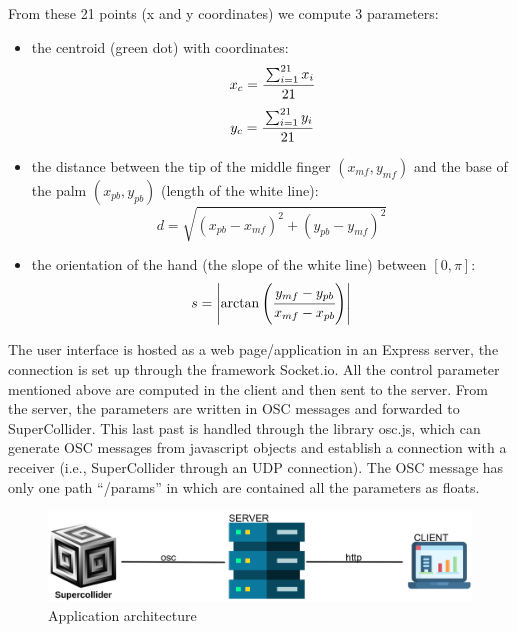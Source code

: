 \documentclass[a4paper,12pt]{report}
\begin{document}
From these 21 points (x and y coordinates) we compute 3 parameters:
\begin{itemize}
	\item the centroid (green dot) with coordinates:
	\[x_c = \cfrac{\sum_{i = 1}^{21}x_i}{21}\]
	\[y_c = \cfrac{\sum_{i = 1}^{21}y_i}{21}\]
	\item the distance between the tip of the middle finger $(x_{mf}, y_{mf})$ and the base of the palm $(x_{pb}, y_{pb})$ (length of the white line): 
	\[d = \sqrt{(x_{pb} - x_{mf})^2 + (y_{pb} - y_{mf})^2}\]
	\item the orientation of the hand (the slope of the white line) between $[0, \pi]$:
	\[s = \left\lvert\arctan{\left(\cfrac {y_{mf} - y_{pb}}{x_{mf} - x_{pb}}\right)}\right\rvert \]
\end{itemize}  

 
The user interface is hosted as a web page/application in an Express server, the connection is set up through the framework Socket.io. All the control parameter mentioned above are computed in the client and then sent to the server. From the server, the parameters are written in OSC messages and forwarded to SuperCollider. This last past is handled through the library osc.js, which can generate OSC messages from javascript objects and establish a connection with a receiver (i.e., SuperCollider through an UDP connection). The OSC message has only one path “/params” in which are contained all the parameters as floats.

\begin{figure}[h]
\centering
\includegraphics[scale=0.4]{arch.png}
\caption{Application architecture}
\end{figure}
\end{document}
